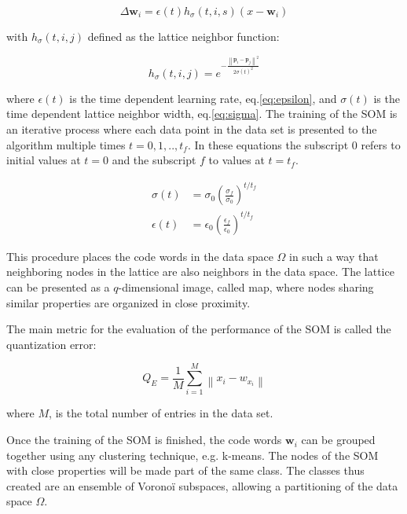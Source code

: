 \begin{equation}
\Delta \boldsymbol{w}_i = \epsilon(t)h_\sigma(t,i,s)(x-\boldsymbol{w}_i) \label{eq:learnsom}
\end{equation}

with $h_\sigma(t,i,j)$ defined as the lattice neighbor function:

\begin{equation}
h_\sigma(t,i,j) = e^{-\frac{\left\lVert \boldsymbol{p}_i - \boldsymbol{p}_j \right\rVert^2}{2\sigma(t)^2}} \label{eq:neigsom}
\end{equation}

where $\epsilon(t)$ is the time dependent learning rate, eq.\eqref{eq:epsilon}, and $\sigma(t)$ is the time dependent lattice neighbor width, eq.\eqref{eq:sigma}. The training of the SOM is an iterative process where each data point in the data set is presented to the algorithm multiple times $t={0, 1,..,t_f}$. In these equations the subscript $0$ refers to initial values at $t=0$ and the subscript $f$ to values at $t=t_f$.

\begin{align}
\sigma(t) & = \sigma_0 \left(\frac{\sigma_f}{\sigma_0}\right)^{t/t_f} \label{eq:sigma} \\
\epsilon(t) & = \epsilon_0 \left(\frac{\epsilon_f}{\epsilon_0}\right)^{t/t_f} \label{eq:epsilon}
\end{align}

This procedure places the code words in the data space $\Omega$ in such a way that neighboring nodes in the lattice are also neighbors in the data space. The lattice can be presented as a $q$-dimensional image, called map, where nodes sharing similar properties are organized in close proximity.

The main metric for the evaluation of the performance of the SOM is called the quantization error:

\begin{equation}
Q_E = \frac{1}{M} \sum_{i=1}^M \left\lVert x_i - w_{x_i} \right\rVert
\end{equation}

where $M$, is the total number of entries in the data set.

Once the training of the SOM is finished, the code words $\boldsymbol{w}_i$ can be grouped together using any clustering technique, e.g. k-means. The nodes of the SOM with close properties will be made part of the same class. The classes thus created are an ensemble of Vorono\"i subspaces, allowing a partitioning of the data space $\Omega$.

